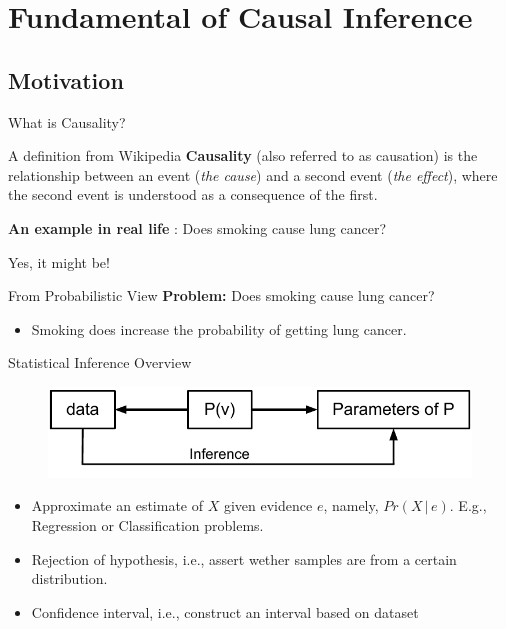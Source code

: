 \section{Fundamental of Causal Inference}
\subsection{Motivation}
\begin{frame}{What is Causality?}
\begin{block}{A definition from Wikipedia}
\textbf{Causality} (also referred to as causation) is the relationship
between an event (\textit{the cause}) and a second event (\textit{the effect}),
where the second event is understood as a consequence of the
first.
\end{block}\pause
\textbf{An example in real life} : Does smoking cause lung cancer?\\
\pause	
\begin{center}
\alert{Yes, it might be!}
\end{center}
\end{frame}
\begin{frame}{From Probabilistic View }
\textbf{Problem:} Does smoking cause lung cancer?\pause
\begin{center}
\begin{itemize}
\item Smoking does \alert{increase the probability} of getting lung cancer.
\end{itemize}
\end{center}
\end{frame}
\begin{frame}{Statistical Inference Overview}
\begin{figure}
\includegraphics[scale=0.7]{imgs/statInf}
\end{figure}
\begin{itemize}
\item Approximate an estimate of $X$ given evidence $e$, namely, $Pr(X\,|\,e)$. E.g., Regression or Classification problems.
\item Rejection of hypothesis, i.e., assert wether samples are from a certain distribution.  
\item Confidence interval, i.e., construct an interval based on dataset 
\end{itemize}
\end{frame}

